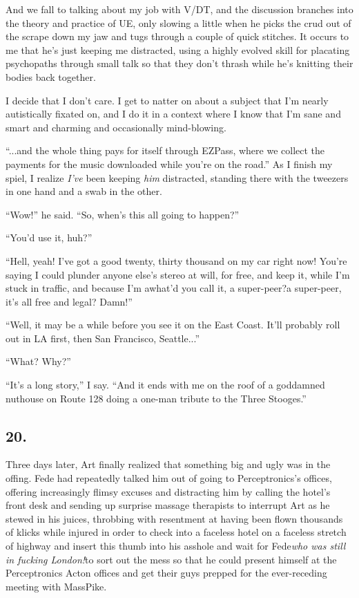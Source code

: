 And we fall to talking about my job with V/DT, and the discussion
branches into the theory and practice of UE, only slowing a little
when he picks the crud out of the scrape down my jaw and tugs
through a couple of quick stitches. It occurs to me that he’s just
keeping me distracted, using a highly evolved skill for placating
psychopaths through small talk so that they don’t thrash while he’s
knitting their bodies back together.

I decide that I don’t care. I get to natter on about a subject that
I’m nearly autistically fixated on, and I do it in a context where
I know that I’m sane and smart and charming and occasionally
mind-blowing.

“...and the whole thing pays for itself through EZPass, where we
collect the payments for the music downloaded while you’re on the
road.” As I finish my spiel, I realize \emph{I’ve} been keeping
\emph{him} distracted, standing there with the tweezers in one hand
and a swab in the other.

“Wow!” he said. “So, when’s this all going to happen?”

“You’d use it, huh?”

“Hell, yeah! I’ve got a good twenty, thirty thousand on my car
right now! You’re saying I could plunder anyone else’s stereo at
will, for free, and keep it, while I’m stuck in traffic, and
because I’m a{\dash}what’d you call it, a super-peer?{\dash}a super-peer, it’s
all free and legal? Damn!”

“Well, it may be a while before you see it on the East Coast. It’ll
probably roll out in LA first, then San Francisco, Seattle...”

“What? Why?”

“It’s a long story,” I say. “And it ends with me on the roof of a
goddamned nuthouse on Route 128 doing a one-man tribute to the
Three Stooges.”

\subsection{20.}

Three days later, Art finally realized that something big and ugly
was in the offing. Fede had repeatedly talked him out of going to
Perceptronics’s offices, offering increasingly flimsy excuses and
distracting him by calling the hotel’s front desk and sending up
surprise massage therapists to interrupt Art as he stewed in his
juices, throbbing with resentment at having been flown thousands of
klicks while injured in order to check into a faceless hotel on a
faceless stretch of highway and insert this thumb into his asshole
and wait for Fede{\dash}\emph{who was still in fucking London!}{\dash}to sort
out the mess so that he could present himself at the Perceptronics
Acton offices and get their guys prepped for the ever-receding
meeting with MassPike.

